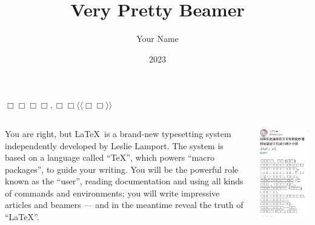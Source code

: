 \documentclass{beamer}
\title{Very Pretty Beamer}
\author{Your Name}
\institute{JI}
\date{2023}
\begin{document}
\frame{\titlepage}

\begin{frame}{$\Box\Box\Box\Box,\Box\Box\langle\langle\Box\Box\rangle\rangle$}
    \begin{columns}[T]
        \begin{column}{0.5\textwidth}
            You are right, but \LaTeX\ is a brand-new typesetting system
            independently developed by Leslie Lamport. The system is based
            on a language called ``\TeX'', which powers ``macro packages'',
            to guide your writing. You will be the powerful role known as
            the ``user'', reading documentation and using all kinds of
            commands and environments; you will write impressive articles
            and beamers — and in the meantime reveal the truth of ``\LaTeX''.
        \end{column}
        \begin{column}{0.3\textwidth}
            \includegraphics[width=\textwidth]{genshin}
        \end{column}
    \end{columns}
\end{frame}
\end{document}
